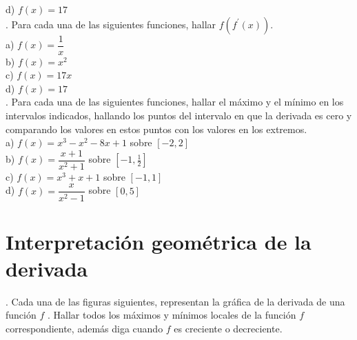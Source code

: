 \documentclass[letterpaper]{article}
\newcommand{\fp}[1]{#1^{\prime}}
\begin{document}

d) $ f(x) = 17 $\\


. Para cada una de las siguientes funciones, hallar $ f(\fp{f} (x)) $.\\

a) $ f(x) = \dfrac{1}{x} $\\


b) $ f(x) = x^{2} $\\


c) $ f(x) = 17x $\\


d) $ f(x) = 17 $\\


. Para cada una de las siguientes funciones, hallar el máximo y el mínimo en los intervalos indicados, hallando los puntos del intervalo en que la derivada es cero y comparando los valores en estos puntos con los valores en los extremos.\\

a) $ f(x) = x^{3} -x^{2} -8x +1$ sobre $ [-2,2] $\\


b) $ f(x) = \dfrac{x+1}{x^{2}+1}$ sobre $ [-1,\frac{1}{2}] $\\


c) $ f(x) = x^{3} +x +1$ sobre $ [-1,1] $\\


d) $ f(x) = \dfrac{x}{x^{2} - 1}$ sobre $ [0,5] $\\


\section*{Interpretación geométrica de la derivada}

. Cada una de las figuras siguientes, representan la gráfica de la derivada de una función $ f $ . Hallar todos los máximos y mínimos locales de la función $ f $ correspondiente, además diga cuando $ f $ es creciente o decreciente.\\
\end{document}
